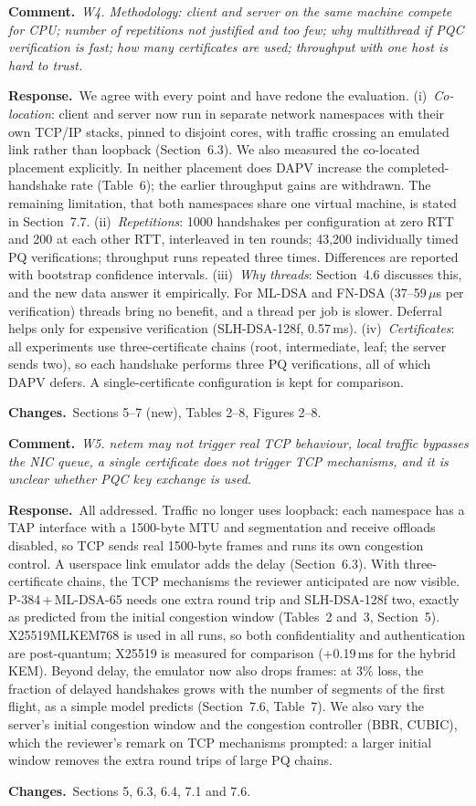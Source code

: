 \documentclass[11pt]{article}
\newcommand{\RC}[1]{\par\medskip\noindent\textcolor{rc}{\textbf{Comment.}}~\textit{#1}\par}
\newcommand{\AR}{\par\noindent\textbf{Response.}~}
\newcommand{\CH}{\par\noindent\textbf{Changes.}~}
\begin{document}
\RC{W4. Methodology: client and server on the same machine compete for CPU;
number of repetitions not justified and too few; why multithread if PQC
verification is fast; how many certificates are used; throughput with one
host is hard to trust.}
\AR We agree with every point and have redone the evaluation.
(i)~\emph{Co-location}: client and server now run in separate network
namespaces with their own TCP/IP stacks, pinned to disjoint cores, with
traffic crossing an emulated link rather than loopback (Section~6.3).  We
also measured the co-located placement explicitly.  In neither placement
does DAPV increase the completed-handshake rate (Table~6); the earlier
throughput gains are withdrawn.  The remaining limitation, that both
namespaces share one virtual machine, is stated in Section~7.7.
(ii)~\emph{Repetitions}: 1000 handshakes per configuration at zero RTT and
200 at each other RTT, interleaved in ten rounds; 43{,}200 individually
timed PQ verifications; throughput runs repeated three times.  Differences
are reported with bootstrap confidence intervals.
(iii)~\emph{Why threads}: Section~4.6 discusses this, and the new data
answer it empirically.  For ML-DSA and FN-DSA (37--59\,$\mu$s per
verification) threads bring no benefit, and a thread per job is slower.
Deferral helps only for expensive verification (SLH-DSA-128f, 0.57\,ms).
(iv)~\emph{Certificates}: all experiments use three-certificate chains
(root, intermediate, leaf; the server sends two), so each handshake
performs three PQ verifications, all of which DAPV defers.  A
single-certificate configuration is kept for comparison.
\CH Sections 5--7 (new), Tables 2--8, Figures 2--8.

\RC{W5. netem may not trigger real TCP behaviour, local traffic bypasses
the NIC queue, a single certificate does not trigger TCP mechanisms, and
it is unclear whether PQC key exchange is used.}
\AR All addressed.  Traffic no longer uses loopback: each namespace has a
TAP interface with a 1500-byte MTU and segmentation and receive offloads
disabled, so TCP sends real 1500-byte frames and runs its own congestion
control.  A userspace link emulator adds the delay (Section~6.3).  With
three-certificate chains, the TCP mechanisms the reviewer anticipated are
now visible.  P-384\,+\,ML-DSA-65 needs one extra round trip and
SLH-DSA-128f two, exactly as predicted from the initial congestion window
(Tables~2 and~3, Section~5).  X25519MLKEM768 is used in all runs, so both
confidentiality and authentication are post-quantum; X25519 is measured for
comparison (+0.19\,ms for the hybrid KEM).  Beyond delay, the emulator now also drops
frames: at 3\% loss, the fraction of delayed handshakes grows with the
number of segments of the first flight, as a simple model predicts
(Section~7.6, Table~7).  We also vary the server's initial congestion
window and the congestion controller (BBR, CUBIC), which the reviewer's
remark on TCP mechanisms prompted: a larger initial window removes the
extra round trips of large PQ chains.
\CH Sections 5, 6.3, 6.4, 7.1 and 7.6.
\end{document}
